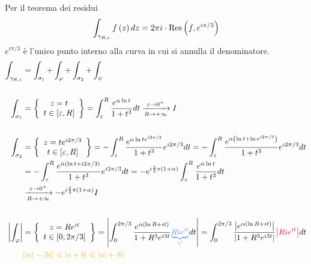 Per il teorema dei residui
\begin{equation*}
\int _{\gamma _{R,\varepsilon }} f\left(z\right) dz = 2\pi i\cdot \operatorname{Res} \left(f,e^{i\pi /3}\right)
\end{equation*}
$e^{i\pi /3}$ è l'unico punto interno alla curva in cui si annulla il denominatore.
\begin{equation*}
\begin{aligned}
\int _{\gamma _{R,\varepsilon }} & = \int _{\sigma _{1}} + \int _{\varphi } + \int _{\sigma _{2}} + \int _{\psi }\\
 & \\
\int _{\sigma _{1}} & = \left\{\begin{array}{ c }
z = t\\
t\in [ \varepsilon ,R]
\end{array}\right\} = \int ^{R}_{\varepsilon }\frac{e^{\alpha \ln t}}{1 + t^{3}} dt\xrightarrow[R\rightarrow + \infty ]{\varepsilon \rightarrow 0^{ + }} I\\
 & \\
\int _{\sigma _{2}} & = \left\{\begin{array}{ c }
z = te^{i2\pi /3}\\
t\in [ \varepsilon ,R]
\end{array}\right\} = - \int ^{R}_{\varepsilon }\frac{e^{\alpha \ln te^{i2\pi /3}}}{1 + t^{3}} e^{i2\pi /3} dt = -\int ^{R}_{\varepsilon }\frac{e^{\alpha \left(\ln t + \ln e^{i2\pi /3}\right)}}{1 + t^{3}} e^{i2\pi /3} dt\\
 & = - \int ^{R}_{\varepsilon }\frac{e^{\alpha (\ln t + i2\pi /3)}}{1 + t^{3}} e^{i2\pi /3} dt = -e^{i\frac{2}{3} \pi (1 + \alpha)}\int ^{R}_{\varepsilon }\frac{e^{\alpha \ln t}}{1 + t^{3}} dt\\
 & \xrightarrow[R\rightarrow + \infty ]{\varepsilon \rightarrow 0^{ + }} - e^{i\frac{2}{3} \pi (1 + \alpha)} I\\
 & \\
\left| \int _{\varphi }\right|  & = \left\{\begin{array}{ c }
z = Re^{it}\\
t\in [ 0,2\pi /3]
\end{array}\right\} = \left| \int ^{2\pi /3}_{0}\frac{e^{\alpha (\ln R + it)}}{1 + R^{3} e^{i3t}}\textcolor[rgb]{0.29,0.56,0.89}{\underbrace{Rie^{it}}_{\gamma '}} dt\right| = \int ^{2\pi /3}_{0}\frac{\left| e^{\alpha (\ln R + it)}\right| }{\left| 1 + R^{3} e^{i3t}\right| }\textcolor[rgb]{0.82,0.01,0.11}{\left| Rie^{it}\right| } dt\\
 & \textcolor[rgb]{0.96,0.65,0.14}{| | a| - | b| | \leqslant | a + b| \leqslant | a| + | b| }\\

\end{aligned}
\end{equation*}
